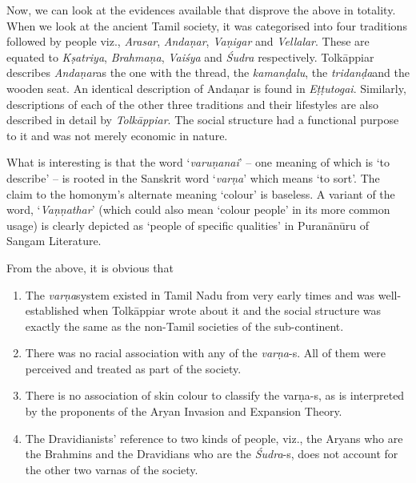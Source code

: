 Now, we can look at the evidences available that disprove the above in totality. When we look at the ancient Tamil society, it was categorised into four traditions followed by people viz., \textit{Arasar}, \textit{Andaṇar}, \textit{Vaṇigar} and \textit{Vellalar}. These are equated to \textit{Kṣatriya}, \textit{Brahmaṇa}, \textit{Vaiśya} and \textit{Śudra} respectively. Tolkāppiar describes \textit{Andaṇar}as the one with the thread, the \textit{kamanḍalu}, the \textit{tridanḍa}and the wooden seat. An identical description of Andaṇar is found in \textit{Eṭṭutogai}. Similarly, descriptions of each of the other three traditions and their lifestyles are also described in detail by \textit{Tolkāppiar}. The social structure had a functional purpose to it and was not merely economic in nature.

What is interesting is that the word ‘\textit{varuṇanai}’ – one meaning of which is ‘to describe’ – is rooted in the Sanskrit word ‘\textit{varṇa}’ which means ‘to sort’. The claim to the homonym’s alternate meaning ‘colour’ is baseless. A variant of the word, ‘\textit{Vaṇṇathar}’ (which could also mean ‘colour people’ in its more common usage) is clearly depicted as ‘people of specific qualities’ in Puranānūru of Sangam Literature.

From the above, it is obvious that

\begin{enumerate}[{\rm i)}]
\itemsep=0pt
\item The \textit{varṇa}system existed in Tamil Nadu from very early times and was well-established when Tolkāppiar wrote about it and the social structure was exactly the same as the non-Tamil societies of the sub-continent.

 \item There was no racial association with any of the \textit{varṇa}-s. All of them were perceived and treated as part of the society.

 \item There is no association of skin colour to classify the varṇa-s, as is interpreted by the proponents of the Aryan Invasion and Expansion Theory.

 \item The Dravidianists’ reference to two kinds of people, viz., the Aryans who are the Brahmins and the Dravidians who are the \textit{Śudra}-s, does not account for the other two varnas of the society.

\end{enumerate}


